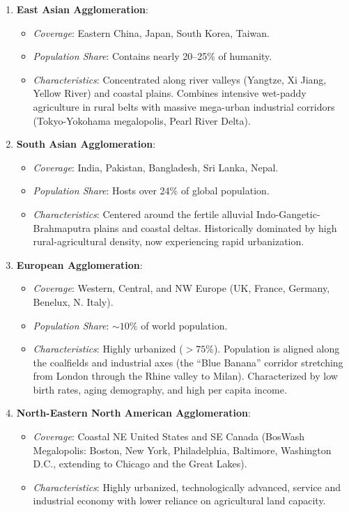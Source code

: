 \documentclass[11pt,a4paper]{article}
\begin{document}
\begin{enumerate}[leftmargin=*]
  \item \textbf{East Asian Agglomeration}:
  \begin{itemize}
    \item \textit{Coverage}: Eastern China, Japan, South Korea, Taiwan.
    \item \textit{Population Share}: Contains nearly 20--25\% of humanity.
    \item \textit{Characteristics}: Concentrated along river valleys (Yangtze, Xi Jiang, Yellow River) and coastal plains. Combines intensive wet-paddy agriculture in rural belts with massive mega-urban industrial corridors (Tokyo-Yokohama megalopolis, Pearl River Delta).
  \end{itemize}

  \item \textbf{South Asian Agglomeration}:
  \begin{itemize}
    \item \textit{Coverage}: India, Pakistan, Bangladesh, Sri Lanka, Nepal.
    \item \textit{Population Share}: Hosts over 24\% of global population.
    \item \textit{Characteristics}: Centered around the fertile alluvial Indo-Gangetic-Brahmaputra plains and coastal deltas. Historically dominated by high rural-agricultural density, now experiencing rapid urbanization.
  \end{itemize}

  \item \textbf{European Agglomeration}:
  \begin{itemize}
    \item \textit{Coverage}: Western, Central, and NW Europe (UK, France, Germany, Benelux, N. Italy).
    \item \textit{Population Share}: $\sim 10\%$ of world population.
    \item \textit{Characteristics}: Highly urbanized ($>75\%$). Population is aligned along the coalfields and industrial axes (the ``Blue Banana'' corridor stretching from London through the Rhine valley to Milan). Characterized by low birth rates, aging demography, and high per capita income.
  \end{itemize}

  \item \textbf{North-Eastern North American Agglomeration}:
  \begin{itemize}
    \item \textit{Coverage}: Coastal NE United States and SE Canada (BosWash Megalopolis: Boston, New York, Philadelphia, Baltimore, Washington D.C., extending to Chicago and the Great Lakes).
    \item \textit{Characteristics}: Highly urbanized, technologically advanced, service and industrial economy with lower reliance on agricultural land capacity.
  \end{itemize}
\end{enumerate}
\end{document}
